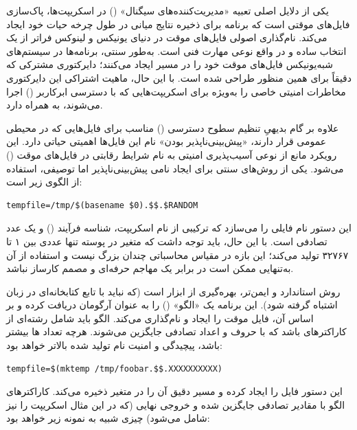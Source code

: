 یکی از دلایل اصلی تعبیه «مدیریت‌کننده‌های سیگنال» () در اسکریپت‌ها، پاک‌سازی فایل‌های موقتی است که برنامه برای ذخیره نتایج میانی در طول چرخه حیات خود ایجاد می‌کند. نام‌گذاری اصولی فایل‌های موقت در دنیای یونیکس و لینوکس فراتر از یک انتخاب ساده و در واقع نوعی مهارت فنی است. به‌طور سنتی، برنامه‌ها در سیستم‌های شبه‌یونیکس فایل‌های موقت خود را در مسیر  ایجاد می‌کنند؛ دایرکتوری مشترکی که دقیقاً برای همین منظور طراحی شده است. با این حال، ماهیت اشتراکی این دایرکتوری مخاطرات امنیتی خاصی را به‌ویژه برای اسکریپت‌هایی که با دسترسی ابرکاربر () اجرا می‌شوند، به همراه دارد.

علاوه بر گام بدیهیِ تنظیم سطوح دسترسی () مناسب برای فایل‌هایی که در محیطی عمومی قرار دارند، «پیش‌بینی‌ناپذیر بودن» نام این فایل‌ها اهمیتی حیاتی دارد. این رویکرد مانع از نوعی آسیب‌پذیری امنیتی به نام شرایط رقابتی در فایل‌های موقت () می‌شود. یکی از روش‌های سنتی برای ایجاد نامی پیش‌بینی‌ناپذیر اما توصیفی، استفاده از الگوی زیر است:

\begin{latin}
\begin{lstlisting}
tempfile=/tmp/$(basename $0).$$.$RANDOM
\end{lstlisting}
\end{latin}

این دستور نام فایلی را می‌سازد که ترکیبی از نام اسکریپت، شناسه فرآیند () و یک عدد تصادفی است. با این حال، باید توجه داشت که متغیر  در پوسته  تنها عددی بین ۱ تا ۳۲۷۶۷ تولید می‌کند؛ این بازه در مقیاس محاسباتی چندان بزرگ نیست و استفاده از آن به‌تنهایی ممکن است در برابر یک مهاجم حرفه‌ای و مصمم کارساز نباشد.

روش استاندارد و ایمن‌تر، بهره‌گیری از ابزار  است (که نباید با تابع کتابخانه‌ای  در زبان  اشتباه گرفته شود). این برنامه یک «الگو» () را به عنوان آرگومان دریافت کرده و بر اساس آن، فایل موقت را ایجاد و نام‌گذاری می‌کند. الگو باید شامل رشته‌ای از کاراکترهای  باشد که با حروف و اعداد تصادفی جایگزین می‌شوند. هرچه تعداد ها بیشتر باشد، پیچیدگی و امنیت نام تولید شده بالاتر خواهد بود:

\begin{latin}
\begin{lstlisting}
tempfile=$(mktemp /tmp/foobar.$$.XXXXXXXXXX)
\end{lstlisting}
\end{latin}

این دستور فایل را ایجاد کرده و مسیر دقیق آن را در متغیر  ذخیره می‌کند. کاراکترهای الگو با مقادیر تصادفی جایگزین شده و خروجی نهایی (که در این مثال  اسکریپت را نیز شامل می‌شود) چیزی شبیه به نمونه زیر خواهد بود:

